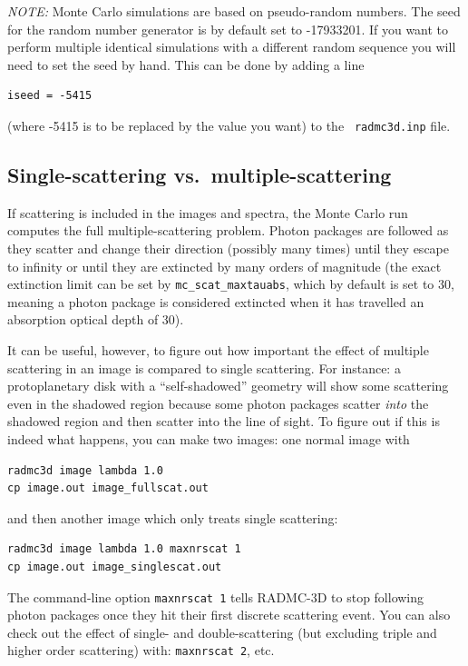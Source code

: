 \documentclass{report}
\begin{document}
{\em NOTE:} Monte Carlo simulations are based on pseudo-random numbers.
The seed for the random number generator is by default set to -17933201.
If you want to perform multiple identical simulations with a different
random sequence you will need to set the seed by hand. This can be
done by adding a line 
{\small\begin{verbatim}
iseed = -5415
\end{verbatim}}
(where -5415 is to be replaced by the value you want) to the {\small\tt
  radmc3d.inp} file.

\subsection{Single-scattering vs.~multiple-scattering}
\label{sec-single-multiple-scattering}
%
If scattering is included in the images and spectra, the Monte Carlo run
computes the full multiple-scattering problem. Photon packages are followed
as they scatter and change their direction (possibly many times) until they
escape to infinity or until they are extincted by many orders of magnitude
(the exact extinction limit can be set by {\small\tt mc\_scat\_maxtauabs},
which by default is set to 30, meaning a photon package is considered
extincted when it has travelled an absorption optical depth of 30).

It can be useful, however, to figure out how important the effect of
multiple scattering in an image is compared to single scattering. For
instance: a protoplanetary disk with a ``self-shadowed'' geometry will
show some scattering even in the shadowed region because some photon
packages scatter {\em into} the shadowed region and then scatter into
the line of sight. To figure out if this is indeed what happens, you
can make two images: one normal image with
{\small\begin{verbatim}
radmc3d image lambda 1.0
cp image.out image_fullscat.out
\end{verbatim}}
and then another image which only treats single scattering:
{\small\begin{verbatim}
radmc3d image lambda 1.0 maxnrscat 1
cp image.out image_singlescat.out
\end{verbatim}}
The command-line option {\small\tt maxnrscat 1} tells RADMC-3D to
stop following photon packages once they hit their first discrete
scattering event. You can also check out the effect of single- and
double-scattering (but excluding triple and higher order scattering)
with: {\small\tt maxnrscat 2}, etc.
\end{document}

